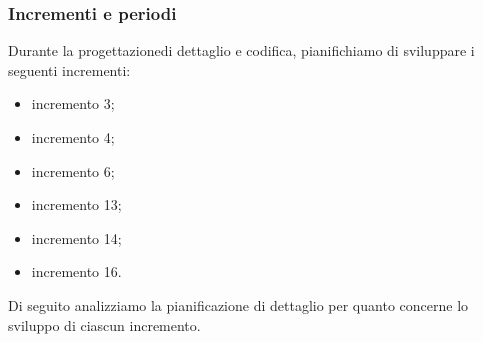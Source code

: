 \subsubsection{Incrementi e periodi}
Durante la progettazione\glosp di dettaglio e codifica, pianifichiamo di sviluppare i seguenti incrementi:
\begin {itemize}
	\item incremento 3;
	\item incremento 4;
	\item incremento 6;
	\item incremento 13;
	\item incremento 14;
	\item incremento 16.
\end {itemize}
Di seguito analizziamo la pianificazione di dettaglio per quanto concerne lo sviluppo di ciascun incremento.
